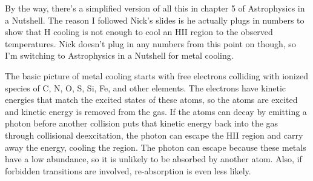 By the way, there's a simplified 
version of all this in chapter 5 of Astrophysics in a Nutshell.  The reason I followed Nick's 
slides is he actually plugs in numbers to show that H cooling is not enough to cool an HII region 
to the observed temperatures.  Nick doesn't plug in any numbers from this point on though, 
so I'm switching to Astrophysics in a Nutshell for metal cooling.

The basic picture of metal cooling starts with free electrons colliding with ionized species of 
C, N, O, S, Si, Fe, and other elements.  The electrons have kinetic energies that match the 
excited states of these atoms, so the atoms are excited and kinetic energy is removed from the 
gas.  If the atoms can decay by emitting a photon before another collision puts that kinetic 
energy back into the gas through collisional deexcitation, the photon can escape the HII region 
and carry away the energy, cooling the region.  The photon can escape because these metals have a 
low abundance, so it is unlikely to be absorbed by another atom.  Also, if forbidden transitions 
are involved, re-absorption is even less likely.  


